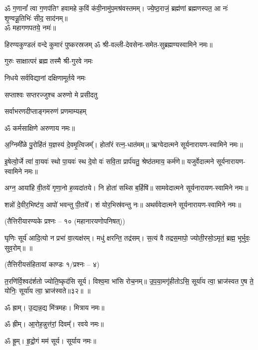 
ॐ ग॒णानां᳚ त्वा ग॒णप॑तिꣳ हवामहे क॒विं क॑वी॒नामु॑प॒मश्र॑\-वस्तमम्। 
ज्ये॒ष्ठ॒राजं॒ ब्रह्म॑णां ब्रह्मणस्पत॒ आ नः॑ शृ॒ण्वन्नू॒तिभिः॑ सीद॒ साद॑नम्॥\\
ॐ महागणपतये॒ नमः॑॥ 

{हिरण्यकुण्डलं वन्दे कुमारं पुष्करस्रजम्}
ॐ श्री-वल्ली-देवसेना-समेत-सुब्रह्मण्यस्वामिने नमः॥


{गुरुः साक्षात्परं ब्रह्म तस्मै श्री-गुरवे नमः}

{निधये सर्वविद्यानां दक्षिणामूर्तये नमः}

{सप्ताश्वः सप्तरज्जुश्च अरुणो मे प्रसीदतु}

{सर्वाभरणदीप्ताङ्गमरुणं प्रणमाम्यहम्}

ॐ कर्मसाक्षिणे अरुणाय नमः॥

अ॒ग्निमी᳚ळे पु॒रोहि॑तं य॒ज्ञस्य॑ दे॒वमृ॒त्विजम्᳚। होता᳚रं रत्न॒-धात॑मम्॥ ऋग्वेदात्मने सूर्यनारायण-स्वामिने नमः॥

इ॒षेत्वो॒र्जे त्वा॑ वा॒यवः॑ स्थो पा॒यवः॑ स्थ दे॒वो वः॑ सवि॒ता प्रार्प॑यतु॒ श्रेष्ठ॑तमाय॒ कर्म॑णे॥ यजुर्वेदात्मने सूर्यनारायण-स्वामिने नमः॥

अग्न॒ आया॑हि वी॒तये॑ गृणा॒नो ह॒व्यदा॑तये। नि होता॑ सथ्सि ब॒र्हिषि॑॥ सामवेदात्मने सूर्यनारायण-स्वामिने नमः॥

शन्नो॑ दे॒वीर॒भिष्ट॑य॒ आपो॑ भवन्तु पी॒तये᳚। शं योर॒भिस्र॑वन्तु नः॥ अथर्ववेदात्मने सूर्यनारायण-स्वामिने नमः॥


\centerline{\normalsize (तैत्तिरीयारण्यके प्रश्नः – १० (महानारयणोपनिषत्))}

घृणिः सूर्य॑ आदि॒त्यो न प्रभा॑ वा॒त्यक्ष॑रम्। 
मधु॑ क्षरन्ति॒ तद्र॑सम्। 
स॒त्यं वै तद्रस॒मापो॒ ज्योती॒रसो॒ऽमृतं॒ ब्रह्म॒ भूर्भुवः॒ सुव॒रोम्॥ \devAya{}॥ %


\centerline{\normalsize (तैत्तिरीयसंहितायां काण्डः १/प्रश्नः – ४)}
त॒रणि॑र्वि॒श्वद॑र्\mbox{}शतो ज्योति॒ष्कृद॑सि सूर्य। विश्व॒मा भा॑सि रोच॒नम्॥ उ॒प॒या॒मगृ॑हीतो\-ऽसि॒ सूर्या॑य त्वा॒ भ्राज॑स्वत ए॒ष ते॒ योनिः॒ सूर्या॑य त्वा॒ भ्राज॑स्वते॥३२॥
\devAya{}॥


ॐ ह्राम्।  उ॒द्यन्न॒द्य मि॑त्रमहः।  मित्राय नमः॥

ॐ ह्रीम्।  आ॒रोह॒न्नुत्त॑रां॒ दिवम्᳚। रवये नमः॥

ॐ ह्रूम्।  हृ॒द्रो॒गं मम॑ सूर्य। सूर्याय नमः॥

